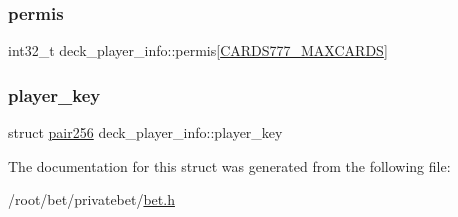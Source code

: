\subsubsection{\texorpdfstring{permis}{permis}}
{\footnotesize\ttfamily int32\+\_\+t deck\+\_\+player\+\_\+info\+::permis\mbox{[}\hyperlink{common_8h_a90f0ea2d767ac1915e44acb24a1fe1bd}{C\+A\+R\+D\+S777\+\_\+\+M\+A\+X\+C\+A\+R\+DS}\mbox{]}}

\mbox{\label{structdeck__player__info_a69c860bb618326b42649fb8dc874b19a}} 
\subsubsection{\texorpdfstring{player\+\_\+key}{player\_key}}
{\footnotesize\ttfamily struct \hyperlink{structpair256}{pair256} deck\+\_\+player\+\_\+info\+::player\+\_\+key}



The documentation for this struct was generated from the following file\+:\begin{DoxyCompactItemize}
\item 
/root/bet/privatebet/\hyperlink{bet_8h}{bet.\+h}\end{DoxyCompactItemize}
